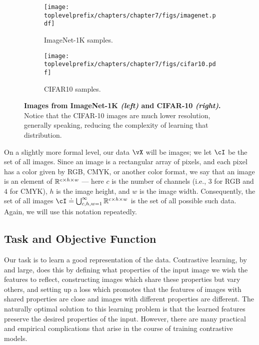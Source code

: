 \documentclass[../../book-main.tex]{subfiles}
\begin{document}
\begin{figure}
    \centering
    
    \hfill 
    \begin{subfigure}{0.3\textwidth}
        \centering 
        \texttt{[image: \\toplevelprefix/chapters/chapter7/figs/imagenet.pdf]}
        \caption{\small ImageNet-1K samples.}
    \end{subfigure}
    \hfill 
    \begin{subfigure}{0.26\textwidth}
        \centering 
        \texttt{[image: \\toplevelprefix/chapters/chapter7/figs/cifar10.pdf]}
        \caption{\small CIFAR10 samples.}
    \end{subfigure}
    \hfill 
    \phantom{}

    \caption{\small\textbf{Images from ImageNet-1K \textit{(left)} and CIFAR-10 \textit{(right)}.} Notice that the CIFAR-10 images are much lower resolution, generally speaking, reducing the complexity of learning that distribution.}
    \label{fig:in1k_cifar10_examples}
\end{figure}

On a slightly more formal level, our data \(\vX\) will be images; we let \(\cI\) be the set of all images. Since an image is a rectangular array of pixels, and each pixel has a color given by RGB, CMYK, or another color format, we say that an image is an element of \(\mathbb{R}^{c \times h \times w}\) --- here \(c\) is the number of channels (i.e., \(3\) for RGB and \(4\) for CMYK), \(h\) is the image height, and \(w\) is the image width. Consequently, the set of all images \(\cI \doteq \bigcup_{c, h, w = 1}^{\infty}\R^{c \times h \times w}\) is the set of all possible such data. Again, we will use this notation repeatedly.


\subsection{Task and Objective Function} \label{sub:contrastive_learning_objective}

Our task is to learn a good representation of the data. Contrastive learning, by and large, does this by defining what properties of the input image we wish the features to reflect, constructing images which share these properties but vary others, and setting up a loss which promotes that the features of images with shared properties are close and images with different properties are different. The naturally optimal solution to this learning problem is that the learned features preserve the desired properties of the input. However, there are many practical and empirical complications that arise in the course of training contrastive models.
\end{document}
